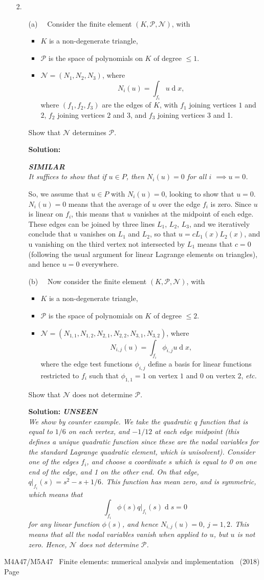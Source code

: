 \documentclass[12pt]{article}
\newcommand{\coursenum}{M4A47/M5A47} %
\newcommand{\coursename}{Finite elements: numerical analysis and implementation} %
\newcommand{\soln}[1]{{\bfseries Solution:} {\itshape \color{blue} #1}}
\newcommand{\soln}[1]{}
\newcommand{\exammarks}[1]{\begin{flushright}[#1 marks]\end{flushright}}%
\DeclareMathOperator{\diff}{d}
\newcommand{\similar}{{\bfseries SIMILAR\\}}
\newcommand{\unseen}{{\bfseries UNSEEN\\}}
\newcommand{\examyear}{2018}
\newenvironment{Question}[1] 
 {\begin{itemize} \item[\large #1.~~]}{\end{itemize} \medskip}
\newcommand{\EndPage}{
	\vfill \coursenum ~ \coursename ~
	(\examyear) \hfill Page \thepage \newpage
	}
\newcommand{\BeginParts}{\begin{itemize}}
\newcommand{\Part}[1]{\item [(#1)~~]}
\newcommand{\EndParts}{\end{itemize}}
\begin{document}
\begin{Question}{2}
\BeginParts
\Part{a}
Consider the finite element $(K,\mathcal{P},\mathcal{N})$, with 
\begin{itemize}
\item $K$ is a non-degenerate triangle,
\item $\mathcal{P}$ is the space of polynomials on $K$ of degree $\leq 1$.
\item $\mathcal{N}=(N_{1},N_{2},N_{3})$,
where 
\[
N_i(u)= \int_{f_i} u\diff x,
\]
where $(f_1,f_2,f_3)$ are the edges of $K$, with $f_1$ joining
vertices $1$ and $2$, $f_2$ joining vertices $2$ and $3$, and $f_3$
joining vertices 3 and 1.
\end{itemize}
Show that $\mathcal{N}$ determines $\mathcal{P}$. \exammarks{10}
\soln{\similar 
  It suffices to show that if $u \in P$, then
   $N_{i}(u)=0$ for all $i$ $\implies u=0$.

   So, we assume that $u\in P$ with $N_{i}(u)=0$, looking to show that
   $u = 0$. $N_i(u)=0$ means that the average of $u$ over the edge
   $f_i$ is zero. Since $u$ is linear on $f_i$, this means that $u$
   vanishes at the midpoint of each edge. These edges can be joined by
   three lines $L_1$, $L_2$, $L_3$, and we iteratively conclude that
   $u$ vanishes on $L_1$ and $L_2$, so that $u=cL_1(x)L_2(x)$, and u
   vanishing on the third vertex not intersected by $L_1$ means that
   $c=0$ (following the usual argument for linear Lagrange elements on
   triangles), and hence $u=0$ everywhere.
 }
 \Part{b} 
  Now consider the finite element $(K,\mathcal{P},\mathcal{N})$, with 
\begin{itemize}
\item $K$ is a non-degenerate triangle,
\item $\mathcal{P}$ is the space of polynomials on $K$ of degree $\leq 2$.
\item $\mathcal{N}=(N_{1,1},N_{1,2},N_{2,1},N_{2,2},N_{3,1},N_{3,2})$,
where 
\[
N_{i,j}(u)= \int_{f_i}\phi_{i,j} u\diff x,
\]
where the edge test functions $\phi_{i,j}$ define
a basis for linear functions restricted to $f_i$ such that $\phi_{1,1}=1$
on vertex $1$ and 0 on vertex $2$, \emph{etc.}
\end{itemize}
Show that $\mathcal{N}$ does not determine $\mathcal{P}$.
\exammarks{10}
\soln{\unseen We show by counter example. We take the quadratic $q$ function that
  is equal to $1/6$ on each vertex, and $-1/12$ at each edge midpoint
  (this defines a unique quadratic function since these are the nodal
  variables for the standard Lagrange quadratic element, which is
  unisolvent). Consider one of the edges $f_i$, and choose a coordinate $s$
  which is equal to 0 on one end of the edge, and 1 on the other end. On
  that edge, $q|_{f_i}(s)=s^2-s + 1/6$. This function has mean zero, and
  is symmetric, which means that
  \[
  \int_{f_i}\phi(s)q|_{f_i}(s)\diff s=0
  \]
  for any linear function $\phi(s)$, and hence $N_{i,j}(u)=0$, $j=1,2$.
  This means that all the nodal variables vanish when applied to $u$, but
  $u$ is not zero. Hence, $\mathcal{N}$ does not determine $\mathcal{P}$.
} \EndParts
\end{Question}
\EndPage
\end{document}
